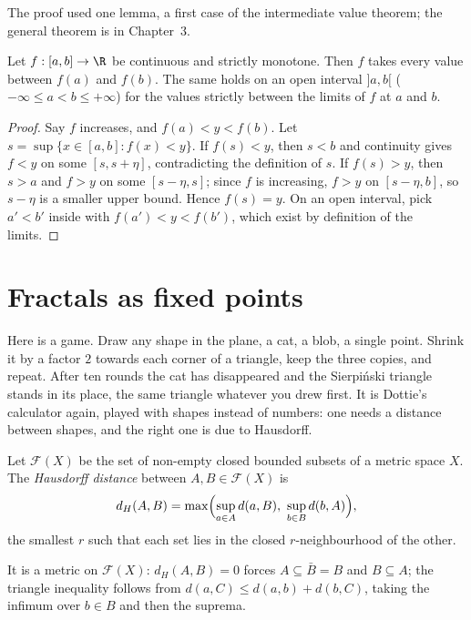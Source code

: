 The proof used one lemma, a first case of the intermediate value theorem; the general theorem is in Chapter~3.

\begin{lemma}\label{lem:monoivt}
Let $f:[a,b]\to\R$ be continuous and strictly monotone. Then $f$ takes every value between $f(a)$ and $f(b)$. The same holds on an open
interval $]a,b[$ ($-\infty\le a<b\le+\infty$) for the values strictly between the limits of $f$ at $a$ and $b$.
\end{lemma}
\begin{proof}
Say $f$ increases, and $f(a)<y<f(b)$. Let $s=\sup\{x\in[a,b]:f(x)<y\}$. If $f(s)<y$, then $s<b$ and continuity gives $f<y$ on some $[s,s+\eta]$, contradicting
the definition of $s$. If $f(s)>y$, then $s>a$ and $f>y$ on some $[s-\eta,s]$; since $f$ is increasing, $f>y$ on $[s-\eta,b]$, so $s-\eta$ is a smaller upper
bound. Hence $f(s)=y$. On an open interval, pick $a'<b'$ inside with $f(a')<y<f(b')$, which exist by definition of the limits.
\end{proof}

\section{Fractals as fixed points}

Here is a game. Draw any shape in the plane, a cat, a blob, a single point. Shrink it by a factor $2$ towards each corner of a
triangle, keep the three copies, and repeat. After ten rounds the cat has disappeared and the Sierpi\'nski triangle stands in
its place, the same triangle whatever you drew first. It is Dottie's calculator again, played with shapes instead of
numbers: one needs a distance between shapes, and the right one is due to Hausdorff.

\begin{definition}
Let $\mathcal F(X)$ be the set of non-empty closed bounded subsets of a metric space $X$. The \emph{Hausdorff distance} between $A,B\in\mathcal F(X)$ is
\[
d_H(A,B)=\max\Bigl(\sup_{a\in A}d(a,B),\ \sup_{b\in B}d(b,A)\Bigr),
\]
the smallest $r$ such that each set lies in the closed $r$-neighbourhood of the other.
\end{definition}

It is a metric on $\mathcal F(X)$: $d_H(A,B)=0$ forces $A\subseteq\bar B=B$ and $B\subseteq A$; the triangle inequality follows from
$d(a,C)\le d(a,b)+d(b,C)$, taking the infimum over $b\in B$ and then the suprema.

